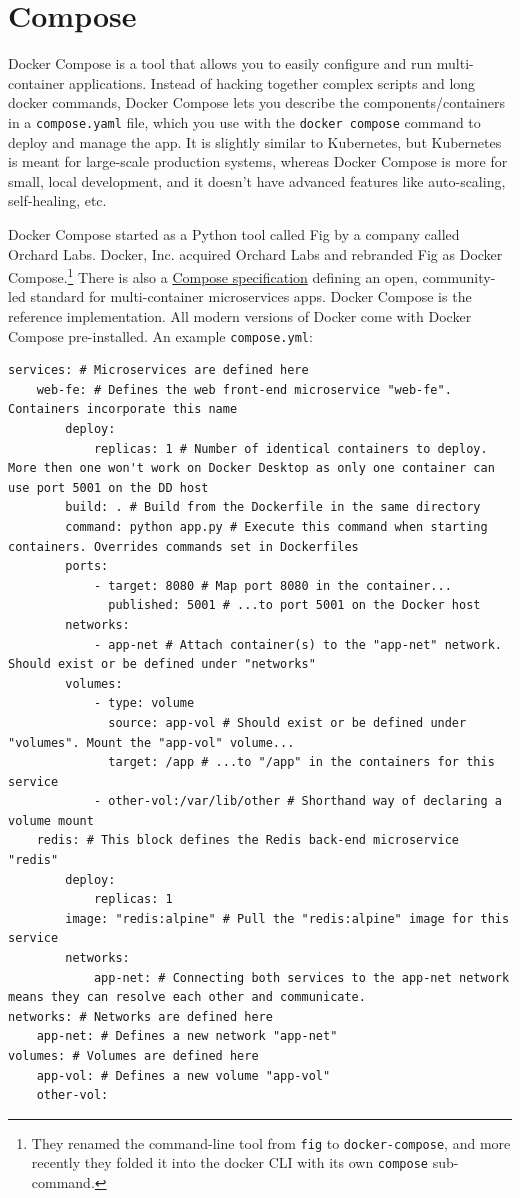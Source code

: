 \documentclass[table, xcdraw]{article}%
\begin{document}
\section{Compose}

Docker Compose is a tool that allows you to easily configure and run multi-container applications. Instead of hacking together complex scripts and long docker commands, Docker Compose lets you describe the components/containers in a \texttt{compose.yaml} file, which you use with the \texttt{docker compose} command to deploy and manage the app. It is slightly similar to Kubernetes, but Kubernetes is meant for large-scale production systems, whereas Docker Compose is more for small, local development, and it doesn't have advanced features like auto-scaling, self-healing, etc.

Docker Compose started as a Python tool called Fig by a company called Orchard Labs. Docker, Inc. acquired Orchard Labs and rebranded Fig as Docker
Compose.\footnote{They renamed the command-line tool from \texttt{fig} to \texttt{docker-compose}, and more recently they folded it into the docker CLI with its own \texttt{compose} sub-command.} There is also a \href{https://www.compose-spec.io/}{Compose specification} defining an open, community-led standard for multi-container microservices apps. Docker Compose is the reference implementation. All modern versions of Docker come with Docker Compose pre-installed. An example \texttt{compose.yml}:

\begin{verbatim}
services: # Microservices are defined here
    web-fe: # Defines the web front-end microservice "web-fe". Containers incorporate this name
        deploy:
            replicas: 1 # Number of identical containers to deploy. More then one won't work on Docker Desktop as only one container can use port 5001 on the DD host
        build: . # Build from the Dockerfile in the same directory
        command: python app.py # Execute this command when starting containers. Overrides commands set in Dockerfiles
        ports:
            - target: 8080 # Map port 8080 in the container...
              published: 5001 # ...to port 5001 on the Docker host
        networks:
            - app-net # Attach container(s) to the "app-net" network. Should exist or be defined under "networks"
        volumes:
            - type: volume
              source: app-vol # Should exist or be defined under "volumes". Mount the "app-vol" volume...
              target: /app # ...to "/app" in the containers for this service
            - other-vol:/var/lib/other # Shorthand way of declaring a volume mount
    redis: # This block defines the Redis back-end microservice "redis"
        deploy:
            replicas: 1
        image: "redis:alpine" # Pull the "redis:alpine" image for this service
        networks:
            app-net: # Connecting both services to the app-net network means they can resolve each other and communicate.
networks: # Networks are defined here
    app-net: # Defines a new network "app-net"
volumes: # Volumes are defined here
    app-vol: # Defines a new volume "app-vol"
    other-vol:
\end{verbatim}
\end{document}
